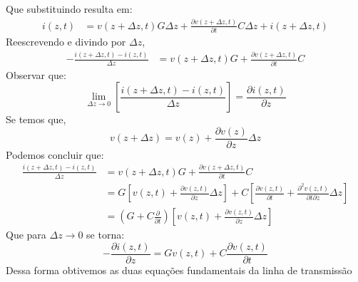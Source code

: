 \documentclass[11pt,a4paper]{article}
\begin{document}
Que substituindo resulta em:
\begin{align*}
  i(z,t) &= v(z+\Delta z, t)G\Delta z + \frac{\partial v(z+\Delta z,t)}{\partial t} C \Delta z + i(z+ \Delta z, t)
\end{align*}
Reescrevendo e divindo por $\Delta z$, 
\begin{align*}
  -\frac{i(z+\Delta z,t)-i(z,t)}{\Delta z} &= v(z+\Delta z, t)G + \frac{\partial v(z+\Delta z, t)}{\partial t}C
\end{align*}
Observar que:
\begin{equation*}
\lim_{ \Delta z \to 0} \left[ \frac{i(z+\Delta z,t) -i(z,t)}{\Delta z} \right] = \frac{ \partial i(z,t)}{\partial z}
\end{equation*}
Se temos que,
\begin{equation*}
  v(z+ \Delta z)  = v(z)+ \frac{\partial v (z)}{\partial z}\Delta z
\end{equation*}
Podemos concluir que:
\begin{align*}
  \frac{i(z+\Delta z,t) -i(z,t)}{\Delta z} &= v(z+\Delta z, t)G + \frac{\partial v(z+\Delta z,t)}{\partial t}C\\
  &= G \left[v(z,t) + \frac{\partial v(z,t)}{\partial z} \Delta z \right]+ C \left[ \frac{\partial v(z,t)}{\partial t} + \frac{\partial^2 v(z,t)}{\partial t \partial z}\Delta z \right] \\
  &= \left( G+C \frac{\partial}{\partial t}\right) \left[ v(z,t)+ \frac{ \partial v (z,t) }{\partial z} \Delta z \right]
\end{align*}
Que para $\Delta z \to 0$ se torna:
\begin{equation}
  -\frac{\partial i(z,t)}{\partial z} = Gv(z,t)+ C \frac{\partial v(z,t)}{\partial t}
\end{equation}
Dessa forma obtivemos as duas equações fundamentais da linha de transmissão
\end{document}

